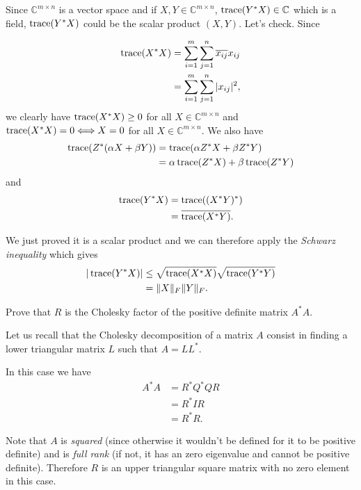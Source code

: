 \begin{solution}
  Since $\mathbb{C}^{m \times n}$ is a vector space and if $X,Y \in \mathbb{C}^{m \times n}$, $\operatorname{trace}(Y^*X) \in \mathbb{C}$ which is a field,
  $\operatorname{trace}(Y^*X)$ could be the scalar product $(X,Y)$.
  Let's check.
  Since

  \begin{align*}
    \operatorname{trace}(X^*X)
    & = \sum_{i = 1}^m \sum_{j = 1}^n \overline{x_{ij}}x_{ij}\\
    & = \sum_{i = 1}^m \sum_{j = 1}^n |x_{ij}|^2,
  \end{align*}
  we clearly have $\operatorname{trace}(X^*X) \geq 0$ for all $X \in \mathbb{C}^{m \times n}$ and
  $\operatorname{trace}(X^*X) = 0 \Longleftrightarrow X = 0$ for all $X \in \mathbb{C}^{m \times n}$.
  We also have
  \begin{align*}
    \operatorname{trace}(Z^*(\alpha X + \beta Y))
    & = \operatorname{trace}(\alpha Z^*X + \beta Z^*Y)\\
    & = \alpha\operatorname{trace}(Z^*X) + \beta\operatorname{trace}(Z^*Y)\\
  \end{align*}
  and
  \begin{align*}
    \operatorname{trace}(Y^*X)
    & = \operatorname{trace}((X^*Y)^*)\\
    & = \overline{\operatorname{trace}(X^*Y)}.
  \end{align*}
  
  We just proved it is a scalar product and we can 
  therefore apply the \emph{Schwarz inequality} which gives
  \begin{align*}
    |\operatorname{trace}(Y^*X)|
    & \leq \sqrt{\operatorname{trace}(X^*X)} \sqrt{\operatorname{trace}(Y^*Y)}\\
    & = \|X\|_F \|Y\|_F.
  \end{align*}
\end{solution}

Prove that $R$ is the Cholesky factor of the positive definite matrix $A^*A$.
\begin{solution}
  Let us recall that the Cholesky decomposition of a matrix $A$ consist in finding
  a lower triangular matrix $L$ such that $A = L L^*$.
  
  In this case we have
  \begin{align*}
    A^*A
    & = R^*Q^*QR\\
    & = R^*IR\\
    & = R^*R.
  \end{align*}

  Note that $A$ is \emph{squared}
  (since otherwise it wouldn't be defined for it to be positive definite)
  and is \emph{full rank} (if not, it has an zero eigenvalue and cannot be positive definite).
  Therefore $R$ is an upper triangular square matrix with no zero element in this case.
\end{solution}

